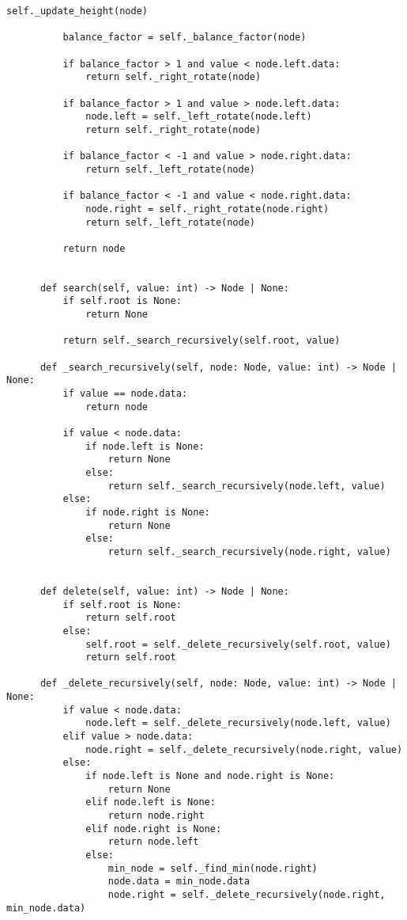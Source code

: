 \begin{lstlisting}[caption=二分ヒープの実装, label=binaryheap, frame=TRBL, label={binaryheap}]
          self._update_height(node)
          
          balance_factor = self._balance_factor(node)
          
          if balance_factor > 1 and value < node.left.data:
              return self._right_rotate(node)
          
          if balance_factor > 1 and value > node.left.data:
              node.left = self._left_rotate(node.left)
              return self._right_rotate(node)
          
          if balance_factor < -1 and value > node.right.data:
              return self._left_rotate(node)
          
          if balance_factor < -1 and value < node.right.data:
              node.right = self._right_rotate(node.right)
              return self._left_rotate(node)
          
          return node
          
      
      def search(self, value: int) -> Node | None:
          if self.root is None:
              return None
          
          return self._search_recursively(self.root, value)
  
      def _search_recursively(self, node: Node, value: int) -> Node | None:
          if value == node.data:
              return node
          
          if value < node.data:
              if node.left is None:
                  return None
              else:
                  return self._search_recursively(node.left, value)
          else:
              if node.right is None:
                  return None
              else:
                  return self._search_recursively(node.right, value)
              
      
      def delete(self, value: int) -> Node | None:
          if self.root is None:
              return self.root
          else:
              self.root = self._delete_recursively(self.root, value)
              return self.root
      
      def _delete_recursively(self, node: Node, value: int) -> Node | None:
          if value < node.data:
              node.left = self._delete_recursively(node.left, value)
          elif value > node.data:
              node.right = self._delete_recursively(node.right, value)
          else:
              if node.left is None and node.right is None:
                  return None
              elif node.left is None:
                  return node.right
              elif node.right is None:
                  return node.left
              else:
                  min_node = self._find_min(node.right)
                  node.data = min_node.data
                  node.right = self._delete_recursively(node.right, min_node.data)
          

\end{lstlisting}
